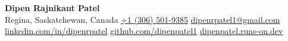 \begin{center}
  {\LARGE\bfseries Dipen Rajnikant Patel}\\[5pt]
  {\small
    Regina, Saskatchewan, Canada
    \enspace\textbar\enspace
    \href{tel:+13065019385}{+1 (306) 501-9385}
    \enspace\textbar\enspace
    \href{mailto:dipenrpatel1@gmail.com}{dipenrpatel1@gmail.com}\\[3pt]
    \href{https://www.linkedin.com/in/dipenrpatel/}{linkedin.com/in/dipenrpatel}
    \enspace\textbar\enspace
    \href{https://github.com/dipenpatel1}{github.com/dipenpatel1}
    \enspace\textbar\enspace
    \href{https://dipenpatel.runs-on.dev}{dipenpatel.runs-on.dev}
  }
\end{center}
